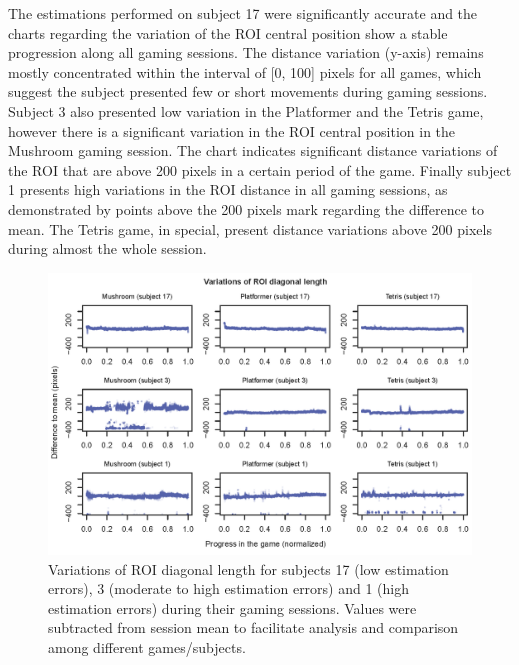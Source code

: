 The estimations performed on subject 17 were significantly accurate and the charts regarding the variation of the ROI central position show a stable progression along all gaming sessions. The distance variation (y-axis) remains mostly concentrated within the interval of [0, 100] pixels for all games, which suggest the subject presented few or short movements during gaming sessions. Subject 3 also presented low variation in the Platformer and the Tetris game, however there is a significant variation in the ROI central position in the Mushroom gaming session. The chart indicates significant distance variations of the ROI that are above 200 pixels in a certain period of the game. Finally subject 1 presents high variations in the ROI distance in all gaming sessions, as demonstrated by points above the 200 pixels mark regarding the difference to mean. The Tetris game, in special, present distance variations above 200 pixels during almost the whole session.

\begin{figure}[!h]
\centering
\includegraphics[width=\textwidth]{figures/variation-roi-diagonal.png}
\caption{Variations of ROI diagonal length for subjects 17 (low estimation errors), 3 (moderate to high estimation errors) and 1 (high estimation errors) during their gaming sessions. Values were subtracted from session mean to facilitate analysis and comparison among different games/subjects.}
\label{fig:chart-roi-anomalies-diagonal}
\end{figure}

